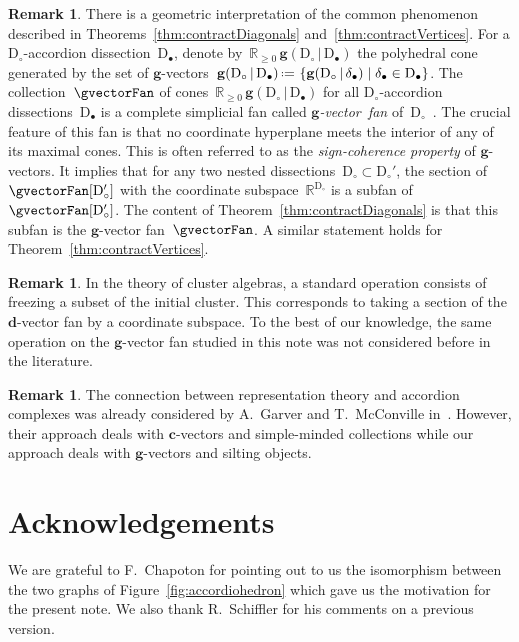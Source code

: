 \documentclass{amsart}
\theoremstyle{definition}
\newtheorem{remark}[theorem]{Remark}
\newcommand{\R}{\mathbb{R}} %
\renewcommand{\b}[1]{\mathbf{#1}} %
\newcommand{\set}[2]{\left\{ #1 \;\middle|\; #2 \right\}} %
\newcommand{\eqdef}{\mbox{\,\raisebox{0.2ex}{\scriptsize\ensuremath{\mathrm:}}\ensuremath{=}\,}} %
\newcommand{\fref}[1]{Figure~\ref{#1}} %
\newcommand{\darkblue}{\color{darkblue}} %
\newcommand{\defn}[1]{\textsl{\darkblue #1}} %
\newcommand{\dissection}{\mathrm{D}} %
\newcommand{\gvector}[2]{\mathbf{g}(#1 \,|\, #2)} %
\begin{document}
\begin{remark}
There is a geometric interpretation of the common phenomenon described in Theorems~\ref{thm:contractDiagonals} and~\ref{thm:contractVertices}.
For a $\dissection_\circ$-accordion dissection~$\dissection_\bullet$, denote by~$\R_{\ge0}\,\gvector{\dissection_\circ}{\dissection_\bullet}$ the polyhedral cone generated by the set of $\b{g}$-vectors~$\gvector{\dissection_\circ}{\dissection_\bullet} \eqdef \set{\gvector{\dissection_\circ}{\delta_\bullet}}{\delta_\bullet \in \dissection_\bullet}$. The collection~$\gvectorFan$ of cones~$\R_{\ge0}\,\gvector{\dissection_\circ}{\dissection_\bullet}$ for all $\dissection_\circ$-accordion dissections~$\dissection_\bullet$ is a complete simplicial fan called \mbox{\defn{$\b{g}$-vector fan}} of~$\dissection_\circ$~\cite{MannevillePilaud-accordion}.
The crucial feature of this fan is that no coordinate hyperplane meets the interior of any of its maximal cones.
This is often referred to as the \defn{sign-coherence property} of $\b{g}$-vectors.
It implies that for any two nested dissections~$\dissection_\circ \subset \dissection_\circ'$, the section of~$\gvectorFan[\dissection_\circ']$ with the coordinate subspace~$\R^{\dissection_\circ}$ is a subfan of~$\gvectorFan[\dissection_\circ']$.
The content of Theorem~\ref{thm:contractDiagonals} is that this subfan is the $\b{g}$-vector fan~$\gvectorFan$.
A similar statement holds for Theorem~\ref{thm:contractVertices}.
\end{remark}

\begin{remark}
In the theory of cluster algebras, a standard operation consists of freezing a subset of the initial cluster.
This corresponds to taking a section of the $\b{d}$-vector fan by a coordinate subspace.
To the best of our knowledge, the same operation on the $\b{g}$-vector fan studied in this note was not considered before in the literature.
\end{remark}

\begin{remark}
The connection between representation theory and accordion complexes was already considered by A.~Garver and T.~McConville in~\cite[Sect.~8]{GarverMcConville}.
However, their approach deals with $\b{c}$-vectors and simple-minded collections while our approach deals with $\b{g}$-vectors and silting objects.
\end{remark}



\section*{Acknowledgements}

We are grateful to F.~Chapoton for pointing out to us the isomorphism between the two graphs of \fref{fig:accordiohedron} which gave us the motivation for the present note.
We also thank R.~Schiffler for his comments on a previous version.




\label{sec:biblio}

\end{document}
